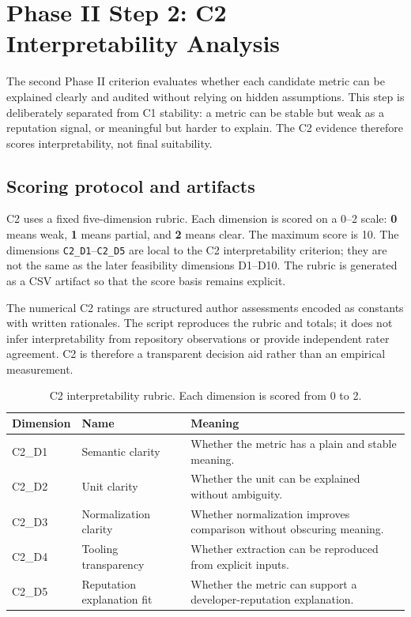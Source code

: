 \section{Phase II Step 2: C2 Interpretability Analysis}
\label{sec:phase2_c2_interpretability}

The second Phase II criterion evaluates whether each candidate metric can be explained clearly and audited
without relying on hidden assumptions. This step is deliberately separated from C1 stability: a metric can be
stable but weak as a reputation signal, or meaningful but harder to explain. The C2 evidence therefore scores
interpretability, not final suitability.

\subsection{Scoring protocol and artifacts}
\label{sec:c2_protocol_artifacts}

C2 uses a fixed five-dimension rubric. Each dimension is scored on a 0--2 scale:
\textbf{0} means weak, \textbf{1} means partial, and \textbf{2} means clear. The maximum score is 10.
The dimensions \texttt{C2\_D1}--\texttt{C2\_D5} are local to the C2 interpretability criterion; they are not
the same as the later feasibility dimensions D1--D10. The rubric is generated as a CSV artifact so that the
score basis remains explicit.

The numerical C2 ratings are structured author assessments encoded as constants with written rationales. The script
reproduces the rubric and totals; it does not infer interpretability from repository observations or provide independent
rater agreement. C2 is therefore a transparent decision aid rather than an empirical measurement.

\begin{table}[H]
\centering
\scriptsize
\renewcommand{\arraystretch}{1.08}
\begin{tabularx}{\textwidth}{p{2.1cm}p{3.6cm}X}
\toprule
\textbf{Dimension} & \textbf{Name} & \textbf{Meaning} \\
\midrule
C2\_D1 & Semantic clarity & Whether the metric has a plain and stable meaning. \\
C2\_D2 & Unit clarity & Whether the unit can be explained without ambiguity. \\
C2\_D3 & Normalization clarity & Whether normalization improves comparison without obscuring meaning. \\
C2\_D4 & Tooling transparency & Whether extraction can be reproduced from explicit inputs. \\
C2\_D5 & Reputation explanation fit & Whether the metric can support a developer-reputation explanation. \\
\bottomrule
\end{tabularx}
\caption{C2 interpretability rubric. Each dimension is scored from 0 to 2.}
\label{tab:c2_rubric}
\end{table}

